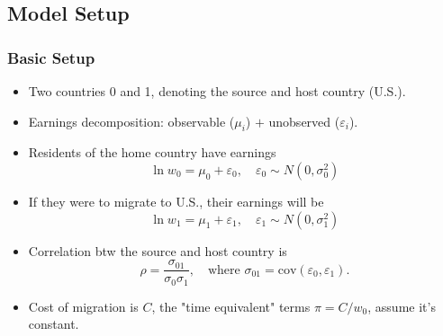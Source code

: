 \documentclass[10pt]{beamer}
\begin{document}
\subsection{Model Setup}
\begin{frame}[c]\frametitle{Basic Setup}
\begin{itemize}
    \item Two countries 0 and 1, denoting the source and host country (U.S.).
    \item Earnings decomposition: observable ($\mu_{i}$) $+$ unobserved ($\varepsilon_{i}$).
    \item Residents of the home country have earnings
    \begin{equation}
        \ln w_{0} = \mu_{0} + \varepsilon_{0}, \quad \varepsilon_{0} \sim N(0,\sigma^{2}_{0})
    \end{equation}
    \item If they were to migrate to U.S., their earnings will be
    \begin{equation}
        \ln w_{1} = \mu_{1} + \varepsilon_{1}, \quad \varepsilon_{1} \sim N(0,\sigma^{2}_{1})
    \end{equation}
\item Correlation btw the source and host country is
\begin{equation*}
    \rho = \frac{\sigma_{01}}{\sigma_{0}\sigma_{1}},\quad \text{where } \sigma_{01} = \mathrm{cov}(\varepsilon_{0},\varepsilon_{1}).
\end{equation*}
\item Cost of migration is $C$, the "time equivalent" terms $\pi = C/w_{0}$, assume it\rq{}s constant.
\end{itemize}
\end{frame}
\end{document}
